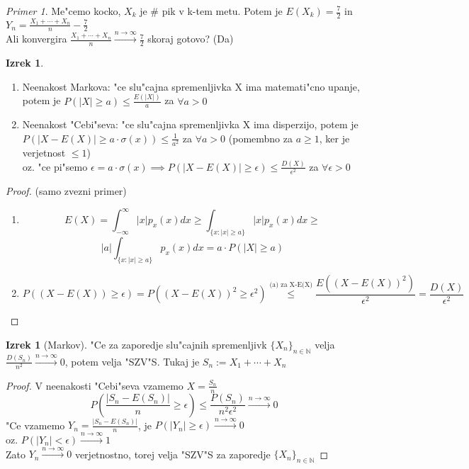 \documentclass[a4paper,12pt]{article}
\theoremstyle{definition}
\newtheorem{theorem}[counter]{Izrek}
\theoremstyle{remark}
\newtheorem*{ex}{Primer}
\newcommand{\N}{\mathbb{N}}
\begin{document}
\begin{ex}
    Me"cemo kocko, $X_k$ je $\#$ pik v k-tem metu. Potem je $E(X_k) = \frac{7}{2}$ in $Y_n = \frac{X_1 + \cdots + X_n}{n} - \frac{7}{2}$ \\
    Ali konvergira $\frac{X_1 + \cdots + X_n}{n} \stackrel{n \to \infty}{\rightarrow} \frac{7}{2}$ skoraj gotovo? (Da)
\end{ex}

\begin{theorem} \text{} \\
    \begin{enumerate}[label=\alph*]
        \item Neenakost Markova: "ce slu"cajna spremenljivka X ima matemati"cno upanje, potem je
            $P(|X| \geq a) \leq \frac{E(|X|)}{a}$ za $\forall a > 0$
        \item Neenakost "Cebi"seva: "ce slu"cajna spremenljivka X ima disperzijo, potem je
            $P(|X - E(X)| \geq a \cdot \sigma(x)) \leq \frac{1}{a^2}$ za $\forall a > 0$ (pomembno za
            $a \geq 1$, ker je verjetnost $\leq 1$) \\
            oz. "ce pi"semo $\epsilon = a \cdot \sigma(x) \implies P(|X - E(X)| \geq \epsilon) \leq \frac{D(X)}{\epsilon^2}$
            za $\forall \epsilon > 0$
    \end{enumerate}
\end{theorem}

\begin{proof}
    (samo zvezni primer)
    \begin{enumerate}[label=\alph*]
        \item \[E(X) = \int_{-\infty}^{\infty} |x| p_x(x) dx \geq \int_{\{x: |x| \geq a\}} |x| p_x(x) dx \geq\]
            \[|a| \int_{\{x: |x| \geq a\}} p_x(x) dx = a \cdot P(|X| \geq a)\]
        \item \[P((X - E(X)) \geq \epsilon) = P((X - E(X))^2 \geq \epsilon^2)
            \stackrel{\text{(a) za X-E(X)}}{\leq} \frac{E((X-E(X))^2)}{\epsilon^2} = \frac{D(X)}{\epsilon^2}\]
    \end{enumerate}
\end{proof}

\begin{theorem}[Markov]
    "Ce za zaporedje slu"cajnih spremenljivk $\{X_n\}_{n \in \N}$ velja $\frac{D(S_n)}{n^2} \stackrel{n \to \infty}{\rightarrow} 0$,
    potem velja "SZV"S. Tukaj je $S_n := X_1 + \cdots + X_n$
\end{theorem}

\begin{proof}
    V neenakosti "Cebi"seva vzamemo $X = \frac{S_n}{n}$
    \[P(\frac{|S_n - E(S_n)|}{n} \geq \epsilon) \leq \frac{P(S_n)}{n^2 \epsilon^2} \stackrel{n \to \infty}{\rightarrow} 0\]
    "Ce vzamemo $Y_n = \frac{|S_n - E(S_n)|}{n}$, je $P(|Y_n| \geq \epsilon) \stackrel{n \to \infty}{\rightarrow} 0$ \\
    oz. $P(|Y_n| < \epsilon) \stackrel{n \to \infty}{\rightarrow} 1$ \\
    Zato $Y_n \stackrel{n \to \infty}{\rightarrow} 0$ verjetnostno, torej velja "SZV"S za zaporedje $\{X_n\}_{n \in \N}$
\end{proof}
\end{document}
